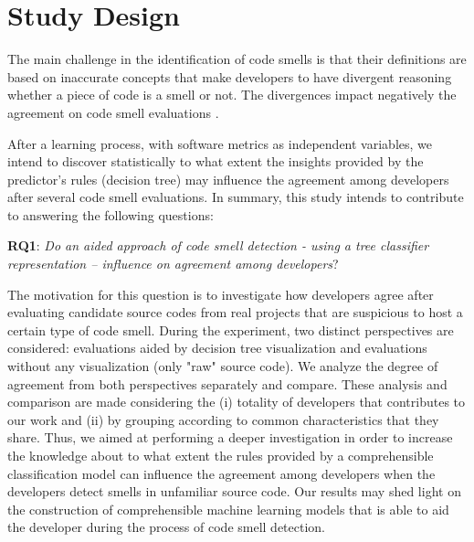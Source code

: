\chapter{Study Design}
\label{sec:studydesign}

The main challenge in the identification of code smells is that their definitions are based on inaccurate concepts that make developers to have divergent reasoning whether a piece of code is a smell or not. The divergences impact negatively the agreement on code smell evaluations \cite{hozano2018you}.

After a learning process, with software metrics as independent variables,  we intend to discover statistically to what extent the insights provided by the predictor's rules (decision tree) may influence the agreement among developers after several code smell evaluations. In summary, this study intends to contribute to answering the following questions:

\textbf{RQ1}: \textit{Do an aided approach of code smell detection - using a tree classifier representation – influence on agreement among developers}?

The motivation for this question is to investigate how developers agree after evaluating candidate source codes from real projects that are suspicious to host a certain type of code smell. During the experiment, two distinct perspectives are considered: evaluations aided by decision tree visualization and evaluations without any visualization (only "raw" source code). We analyze the degree of agreement from both perspectives separately and compare.
These analysis and comparison are made considering the (i) totality of developers that contributes to our work and (ii) by grouping according to common characteristics that they share. Thus, we aimed at performing a deeper investigation in order to increase the knowledge about to what extent the rules provided by a comprehensible classification model can influence the agreement among developers when the developers detect smells in unfamiliar source code. Our results may shed light on the construction of comprehensible machine learning models that is able to aid the developer during the process of code smell detection.



